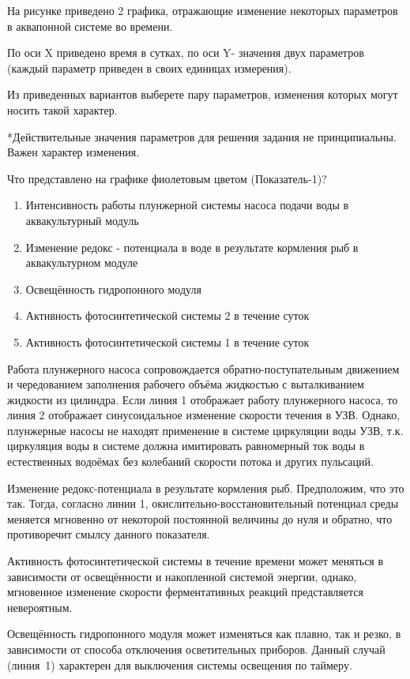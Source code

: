 
На рисунке приведено 2 графика, отражающие изменение некоторых параметров в аквапонной системе во времени.

По оси X приведено время в сутках, по оси Y- значения двух параметров (каждый параметр приведен в своих единицах измерения). 

Из приведенных вариантов выберете пару параметров, изменения которых могут носить такой характер.


*Действительные значения параметров для решения задания не принципиальны. Важен характер изменения.

Что представлено на графике фиолетовым цветом (Показатель-1)?

\begin{enumerate}
    \item Интенсивность работы плунжерной системы насоса подачи воды в аквакультурный модуль
    \item Изменение редокс - потенциала в воде в результате кормления рыб в аквакультурном модуле
    \item Освещённость гидропонного модуля
    \item Активность фотосинтетической системы 2 в течение суток
    \item Активность фотосинтетической системы 1 в течение суток
\end{enumerate}

\explanationSection

Работа плунжерного насоса сопровождается обратно-поступательным движением и чередованием заполнения рабочего объёма жидкостью с выталкиванием жидкости из цилиндра. Если линия 1 отображает работу плунжерного насоса, то линия 2 отображает синусоидальное изменение скорости течения в УЗВ. Однако, плунжерные насосы не находят применение в системе циркуляции воды УЗВ, т.к. циркуляция воды в системе должна имитировать равномерный ток воды в естественных водоёмах без колебаний скорости потока и других пульсаций.

Изменение редокс-потенциала в результате кормления рыб. Предположим, что это так. Тогда, согласно линии 1, окислительно-восстановительный потенциал среды меняется мгновенно от некоторой постоянной величины до нуля и обратно, что противоречит смылсу данного показателя.

Активность фотосинтетической системы в течение времени может меняться в зависимости от освещённости и накопленной системой энергии, однако, мгновенное изменение скорости ферментативных реакций представляется невероятным.

Освещённость гидропонного модуля может изменяться как плавно, так и резко, в зависимости от способа отключения осветительных приборов. Данный случай (линия~1) характерен для выключения системы освещения по таймеру.

